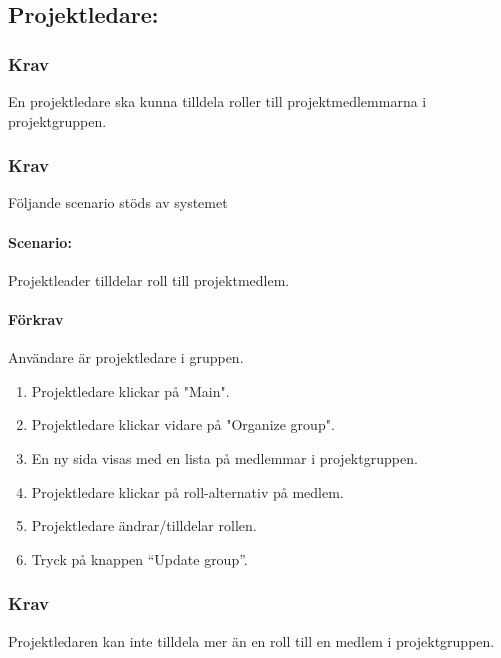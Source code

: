 \documentclass[paper=a4, fontsize=11pt,twoside]{article}
\begin{document}
\subsection{Projektledare:}

\subsubsection{Krav} En projektledare ska kunna tilldela roller till projektmedlemmarna i projektgruppen.

\paragraph{}
\subsubsection{Krav}
Följande scenario stöds av systemet
\paragraph{Scenario:}
Projektleader tilldelar roll till projektmedlem.
\paragraph{Förkrav}
Användare är projektledare i gruppen.
\begin{enumerate} 
\item Projektledare klickar på "Main".
\item Projektledare klickar vidare på "Organize group".
\item En ny sida visas med en lista på medlemmar i projektgruppen.
\item Projektledare klickar på roll-alternativ på medlem.
\item Projektledare ändrar/tilldelar rollen.
\item Tryck på knappen “Update group”.
\end{enumerate}

\paragraph{}
\subsubsection{Krav}
	Projektledaren kan inte tilldela mer än en roll till en medlem i projektgruppen.

\paragraph{}
\end{document}
